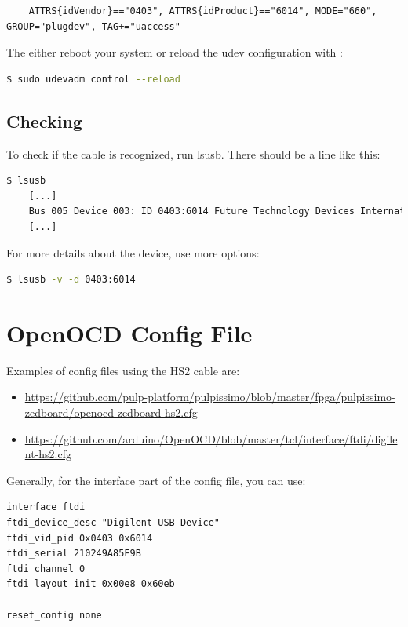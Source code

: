 \documentclass{article}
\begin{document}
    \begin{lstlisting}
    ATTRS{idVendor}=="0403", ATTRS{idProduct}=="6014", MODE="660", GROUP="plugdev", TAG+="uaccess"
    \end{lstlisting}
    
    The either reboot your system or reload the udev configuration with :
    
    \begin{lstlisting}[language=bash]
    $ sudo udevadm control --reload
    \end{lstlisting}
    
    \subsection{Checking}
    
    To check if the cable is recognized, run lsusb. There should be a line like this:
    
    \begin{lstlisting}[language=bash]
    $ lsusb
    [...]
    Bus 005 Device 003: ID 0403:6014 Future Technology Devices International, Ltd FT232H Single HS USB-UART/FIFO IC
    [...]
    \end{lstlisting}
    
    For more details about the device, use more options:
    
    \begin{lstlisting}[language=bash]
    $ lsusb -v -d 0403:6014
    \end{lstlisting}
    
    \newpage
    \section{OpenOCD Config File}
    
    Examples of config files using the HS2 cable are:
    
    \vspace{-\topsep}
	\begin{itemize}
	\item \url{https://github.com/pulp-platform/pulpissimo/blob/master/fpga/pulpissimo-zedboard/openocd-zedboard-hs2.cfg}
	\item \url{https://github.com/arduino/OpenOCD/blob/master/tcl/interface/ftdi/digilent-hs2.cfg}
	\end{itemize}
	
	Generally, for the interface part of the config file, you can use:
	
	\begin{lstlisting}
interface ftdi
ftdi_device_desc "Digilent USB Device"
ftdi_vid_pid 0x0403 0x6014
ftdi_serial 210249A85F9B
ftdi_channel 0						
ftdi_layout_init 0x00e8 0x60eb

reset_config none
    \end{lstlisting}
    
\end{document}
